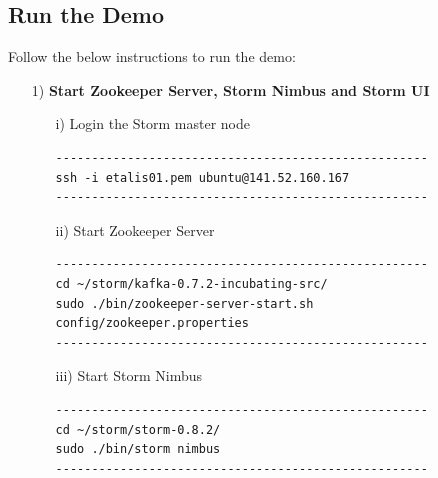 \documentclass[a4paper, 12pt]{article}
\begin{document}
\subsection{Run the Demo}
Follow the below instructions to run the demo:
\begin{itemize}
\item[1)] \textbf{Start Zookeeper Server, Storm Nimbus and Storm UI}\\
\begin{itemize}
\item[i)] Login the Storm master node
\begin{lstlisting}
----------------------------------------------------
ssh -i etalis01.pem ubuntu@141.52.160.167
----------------------------------------------------
\end{lstlisting}

\item[ii)] Start Zookeeper Server
\begin{lstlisting}
----------------------------------------------------
cd ~/storm/kafka-0.7.2-incubating-src/
sudo ./bin/zookeeper-server-start.sh config/zookeeper.properties
----------------------------------------------------
\end{lstlisting}

\item[iii)] Start Storm Nimbus
\begin{lstlisting}
----------------------------------------------------
cd ~/storm/storm-0.8.2/
sudo ./bin/storm nimbus
----------------------------------------------------
\end{lstlisting}


\end{itemize}
\end{itemize}
\end{document}
